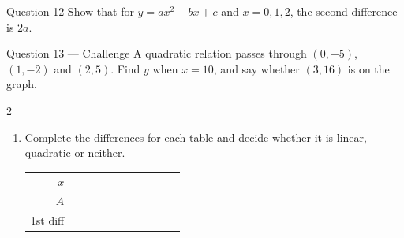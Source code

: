 \documentclass[11pt]{article}
\begin{document}
\begin{qbox}{Question 12}
Show that for $y=ax^2+bx+c$ and $x=0,1,2$, the second difference is $2a$.\workspace{3.2cm}
\end{qbox}

\begin{qbox}{Question 13 --- Challenge}
A quadratic relation passes through $(0,-5)$, $(1,-2)$ and $(2,5)$. Find $y$ when $x=10$, and say whether $(3,16)$ is on the graph.\workspace{3.4cm}
\end{qbox}

\clearpage
{}

\begin{recapbox}
\begin{multicols}{2}
\small
\begin{enumerate}[leftmargin=*,itemsep=3pt]
  \item Complete the differences for each table and decide whether it is linear, quadratic or neither.
\begin{center}\renewcommand{\arraystretch}{1.15}\setlength{\tabcolsep}{2pt}\begin{tabular}{r|>{\centering\arraybackslash}p{0.62cm}>{\centering\arraybackslash}p{0.62cm}>{\centering\arraybackslash}p{0.62cm}>{\centering\arraybackslash}p{0.62cm}>{\centering\arraybackslash}p{0.62cm}>{\centering\arraybackslash}p{0.62cm}>{\centering\arraybackslash}p{0.62cm}>{\centering\arraybackslash}p{0.62cm}>{\centering\arraybackslash}p{0.62cm}>{\centering\arraybackslash}p{0.62cm}}
$x$ & \multicolumn{2}{c}{\colorbox{iagreen}{\makebox[1.12cm]{\strut \color{white}\bfseries $1$}}} & \multicolumn{2}{c}{\colorbox{iagreen}{\makebox[1.12cm]{\strut \color{white}\bfseries $2$}}} & \multicolumn{2}{c}{\colorbox{iagreen}{\makebox[1.12cm]{\strut \color{white}\bfseries $3$}}} & \multicolumn{2}{c}{\colorbox{iagreen}{\makebox[1.12cm]{\strut \color{white}\bfseries $4$}}} & \multicolumn{2}{c}{\colorbox{iagreen}{\makebox[1.12cm]{\strut \color{white}\bfseries $5$}}} \\[2pt]
$A$ & \multicolumn{2}{c}{\colorbox{keybg}{\makebox[1.12cm]{\strut $2$}}} & \multicolumn{2}{c}{\colorbox{keybg}{\makebox[1.12cm]{\strut $5$}}} & \multicolumn{2}{c}{\colorbox{keybg}{\makebox[1.12cm]{\strut $10$}}} & \multicolumn{2}{c}{\colorbox{keybg}{\makebox[1.12cm]{\strut $17$}}} & \multicolumn{2}{c}{\colorbox{keybg}{\makebox[1.12cm]{\strut $26$}}} \\[2pt]
\textcolor{exblue}{\scriptsize 1st diff} & & \multicolumn{2}{c}{\fbox{\makebox[0.94cm]{\strut}}} & \multicolumn{2}{c}{\fbox{\makebox[0.94cm]{\strut}}} & \multicolumn{2}{c}{\fbox{\makebox[0.94cm]{\strut}}} & \multicolumn{2}{c}{\fbox{\makebox[0.94cm]{\strut}}} & \\[2pt]

\end{tabular}
\end{center}
\end{enumerate}
\end{multicols}
\end{recapbox}
\end{document}
